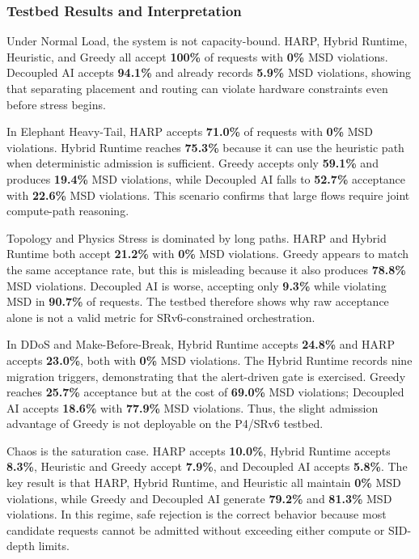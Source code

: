 \documentclass[12pt, a4paper, reqno, oneside]{book}
\begin{document}
\subsubsection{Testbed Results and Interpretation}

Under Normal Load, the system is not capacity-bound. HARP, Hybrid Runtime, Heuristic, and Greedy all accept \textbf{100\%} of requests with \textbf{0\%} MSD violations. Decoupled AI accepts \textbf{94.1\%} and already records \textbf{5.9\%} MSD violations, showing that separating placement and routing can violate hardware constraints even before stress begins.

In Elephant Heavy-Tail, HARP accepts \textbf{71.0\%} of requests with \textbf{0\%} MSD violations. Hybrid Runtime reaches \textbf{75.3\%} because it can use the heuristic path when deterministic admission is sufficient. Greedy accepts only \textbf{59.1\%} and produces \textbf{19.4\%} MSD violations, while Decoupled AI falls to \textbf{52.7\%} acceptance with \textbf{22.6\%} MSD violations. This scenario confirms that large flows require joint compute-path reasoning.

Topology and Physics Stress is dominated by long paths. HARP and Hybrid Runtime both accept \textbf{21.2\%} with \textbf{0\%} MSD violations. Greedy appears to match the same acceptance rate, but this is misleading because it also produces \textbf{78.8\%} MSD violations. Decoupled AI is worse, accepting only \textbf{9.3\%} while violating MSD in \textbf{90.7\%} of requests. The testbed therefore shows why raw acceptance alone is not a valid metric for SRv6-constrained orchestration.

In DDoS and Make-Before-Break, Hybrid Runtime accepts \textbf{24.8\%} and HARP accepts \textbf{23.0\%}, both with \textbf{0\%} MSD violations. The Hybrid Runtime records nine migration triggers, demonstrating that the alert-driven gate is exercised. Greedy reaches \textbf{25.7\%} acceptance but at the cost of \textbf{69.0\%} MSD violations; Decoupled AI accepts \textbf{18.6\%} with \textbf{77.9\%} MSD violations. Thus, the slight admission advantage of Greedy is not deployable on the P4/SRv6 testbed.

Chaos is the saturation case. HARP accepts \textbf{10.0\%}, Hybrid Runtime accepts \textbf{8.3\%}, Heuristic and Greedy accept \textbf{7.9\%}, and Decoupled AI accepts \textbf{5.8\%}. The key result is that HARP, Hybrid Runtime, and Heuristic all maintain \textbf{0\%} MSD violations, while Greedy and Decoupled AI generate \textbf{79.2\%} and \textbf{81.3\%} MSD violations. In this regime, safe rejection is the correct behavior because most candidate requests cannot be admitted without exceeding either compute or SID-depth limits.
\end{document}
